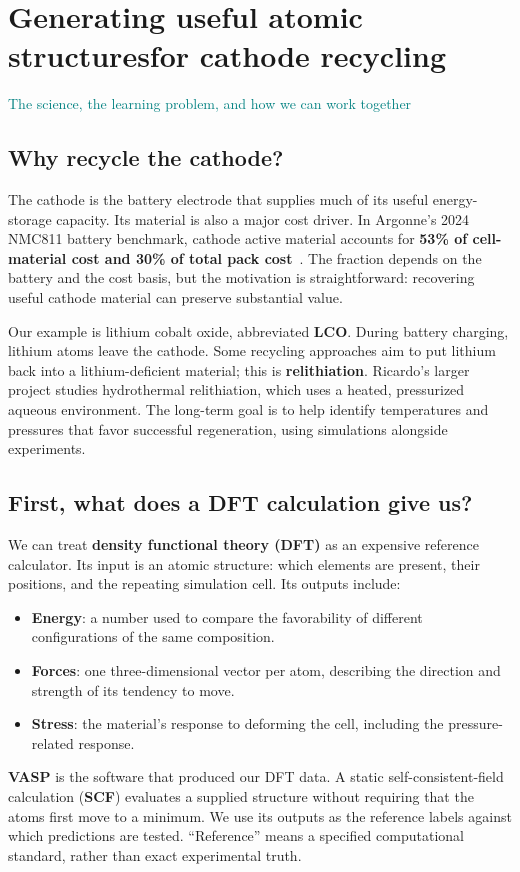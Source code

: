 \section*{Generating useful atomic structures\newline for cathode recycling}
{\large\textcolor{teal}{The science, the learning problem, and how we can work together}}

\subsection*{Why recycle the cathode?}
The cathode is the battery electrode that supplies much of its useful energy-storage capacity. Its material is also a major cost driver. In Argonne's 2024 NMC811 battery benchmark, cathode active material accounts for \textbf{53\% of cell-material cost and 30\% of total pack cost}~\cite{cost}. The fraction depends on the battery and the cost basis, but the motivation is straightforward: recovering useful cathode material can preserve substantial value.

Our example is lithium cobalt oxide, abbreviated \textbf{LCO}. During battery charging, lithium atoms leave the cathode. Some recycling approaches aim to put lithium back into a lithium-deficient material; this is \textbf{relithiation}. Ricardo's larger project studies hydrothermal relithiation, which uses a heated, pressurized aqueous environment. The long-term goal is to help identify temperatures and pressures that favor successful regeneration, using simulations alongside experiments.

\subsection*{First, what does a DFT calculation give us?}
We can treat \textbf{density functional theory (DFT)} as an expensive reference calculator. Its input is an atomic structure: which elements are present, their positions, and the repeating simulation cell. Its outputs include:
\begin{itemize}
\item \textbf{Energy}: a number used to compare the favorability of different configurations of the same composition.
\item \textbf{Forces}: one three-dimensional vector per atom, describing the direction and strength of its tendency to move.
\item \textbf{Stress}: the material's response to deforming the cell, including the pressure-related response.
\end{itemize}
\textbf{VASP} is the software that produced our DFT data. A static self-consistent-field calculation (\textbf{SCF}) evaluates a supplied structure without requiring that the atoms first move to a minimum. We use its outputs as the reference labels against which predictions are tested. ``Reference'' means a specified computational standard, rather than exact experimental truth.

